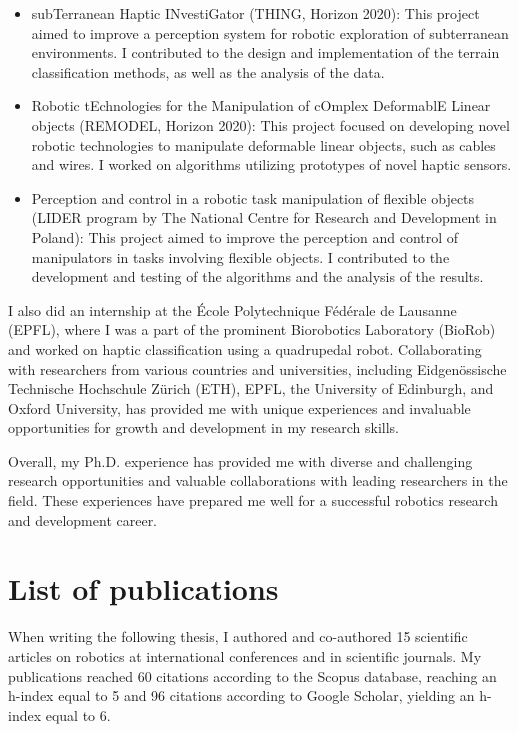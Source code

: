 \documentclass[a4paper, 10pt, twoside]{report}
\begin{document}
\begin{itemize}
    \item subTerranean Haptic INvestiGator (THING, Horizon 2020): This project aimed to improve a perception system for robotic exploration of subterranean environments. I contributed to the design and implementation of the terrain classification methods, as well as the analysis of the data.
    
    \item Robotic tEchnologies for the Manipulation of cOmplex DeformablE Linear objects (REMODEL, Horizon 2020): This project focused on developing novel robotic technologies to manipulate deformable linear objects, such as cables and wires. I worked on algorithms utilizing prototypes of novel haptic sensors.
    
    \item Perception and control in a robotic task manipulation of flexible objects (LIDER program by The National Centre for Research and Development in Poland): This project aimed to improve the perception and control of manipulators in tasks involving flexible objects. I contributed to the development and testing of the algorithms and the analysis of the results.
\end{itemize}

I also did an internship at the École Polytechnique Fédérale de Lausanne (EPFL), where I was a part of the prominent Biorobotics Laboratory (BioRob) and worked on haptic classification using a quadrupedal robot. Collaborating with researchers from various countries and universities, including Eidgenössische Technische Hochschule Zürich (ETH), EPFL, the University of Edinburgh, and Oxford University, has provided me with unique experiences and invaluable opportunities for growth and development in my research skills. 

Overall, my Ph.D. experience has provided me with diverse and challenging research opportunities and valuable collaborations with leading researchers in the field. These experiences have prepared me well for a successful robotics research and development career.

\section{List of publications}

When writing the following thesis, I authored and co-authored 15 scientific articles on robotics at international conferences and in scientific journals. My publications reached 60 citations according to the Scopus database, reaching an h-index equal to 5 and 96 citations according to Google Scholar, yielding an h-index equal to 6.
\end{document}
